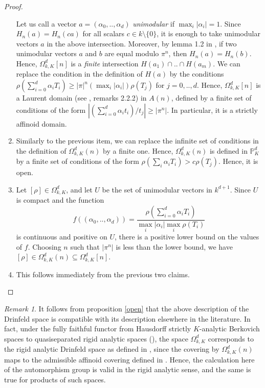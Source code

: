 \documentclass{amsart}
\theoremstyle{theorem}
\theoremstyle{lemma}
\theoremstyle{prop}
\theoremstyle{definition}
\theoremstyle{corollary}
\theoremstyle{remark}
\newtheorem{remark}[lemma]{Remark}
\newcommand{\PR}{\mathbb{P}}
\begin{document}
\begin{proof}
\begin{enumerate}
Let us call a vector $a=(\alpha_0,..,\alpha_d)$ \emph{unimodular} if $\max_i |\alpha_i|=1$. 
Since $H_n(a)=H_n(ca)$ for all scalars $c\in k \setminus \{0 \}$, it is enough to take unimodular vectors $a$ in the above intersection. Moreover, by lemma 1.2 in \cite{ss}, if two unimodular vectors $a$ and $b$ are equal modulo $\pi^n$, then $H_n(a)=H_n(b)$. Hence, $\Omega^d_{k,K}[n]$ is a \emph{finite} intersection $H(a_1) \cap .. \cap H(a_m)$. 
We can replace the condition in the definition of $H(a)$ by the conditions $\rho(\sum_{i=0}^{d}\alpha_i T_i) \geq |\pi|^n   (\max_i {|\alpha_i|} ){\rho(T_j)}$ for $j=0,..,d$. Hence, $\Omega^d_{k,K}[n]$ is a Laurent domain (see \cite{ber2}, remarks 2.2.2) in $A(n)$, defined by a finite set of conditions of the form $|(\sum_{i=0}^d \alpha_i t_i)/t_j| \geq |\pi^n|$. In particular, it is a strictly affinoid domain.
\item
Similarly to the previous item, we can replace the infinite set of conditions in the definition of $\Omega^{d}_{k,K}(n)$ by a finite one. Hence, $\Omega^{d}_{k,K}(n)$ is defined in  $\PR^d_K$  by a finite set of conditions of the form $\rho(\sum_i \alpha_i T_i) > c \rho(T_j)$. Hence, it is open.
\item
Let $[\rho] \in \Omega^d_{k,K}$, and let $U$ be the set of unimodular vectors in $k^{d+1}$. Since $U$ is compact and the function $$f((\alpha_0,..,\alpha_d))=\frac{\rho(\sum_{i=0}^{d}\alpha_i T_i)}{\max_i {|\alpha_i|}\max_i {\rho(T_i)}}$$ is continuous and positive on $U$, there is a positive lower bound on the values of $f$. Choosing $n$ such that $|\pi^n|$ is less than the lower bound, we have $[\rho] \in \Omega^{d}_{k,K}(n) \subseteq \Omega^{d}_{k,K}[n]$.
\item
This follows immediately from the previous two claims. \qedhere
\end{enumerate}\end{proof}

\begin{remark}
It follows from proposition \ref{open} that the above description of the Drinfeld space is compatible with its description elsewhere in the literature. In fact, under the fully faithful functor from Hausdorff strictly $K$-analytic Berkovich spaces to quasiseparated rigid analytic spaces (\cite[Theorem 1.6.1]{ber4}), the space $\Omega^{d}_{k,K}$ corresponds to the rigid analytic Drinfeld space as defined in \cite{ss}, since the covering by $\Omega^{d}_{k,K}(n)$ maps to the admissible affinoid covering defined in \cite{ss}. Hence, the calculation here of the automorphism group is valid in the rigid analytic sense, and the same is true for products of such spaces.
\end{remark}
\end{document}
